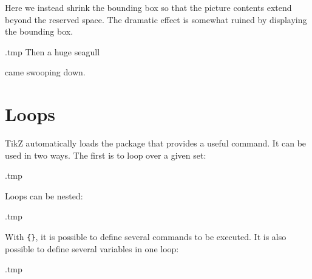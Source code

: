 Here we instead shrink the bounding box
so that the picture contents extend beyond the reserved space.
The dramatic effect is somewhat ruined by displaying the bounding box.
%
\begin{VerbatimOut}{\jobname.tmp}
\centering
Then a huge seagull
came swooping down.
\end{VerbatimOut}
\ShowExampleBelow[2]



%
%
\section{Loops}\label{sec:pgffor}

TikZ automatically loads the  package that provides a useful  command.
It can be used in two ways.
The first is to loop over a given set:
%
\begin{VerbatimOut}{\jobname.tmp}
\centering
{}
\end{VerbatimOut}
\ShowExampleBelow[2]
%
Loops can be nested:
%
\begin{VerbatimOut}{\jobname.tmp}
\centering
{}
\end{VerbatimOut}
\ShowExampleBelow[2]
With \verb|{}|, it is possible to define several commands to be executed.
It is also possible to define several variables in one loop:
%
\begin{VerbatimOut}{\jobname.tmp}
\centering
{}
\end{VerbatimOut}
\ShowExampleBelow[2]

